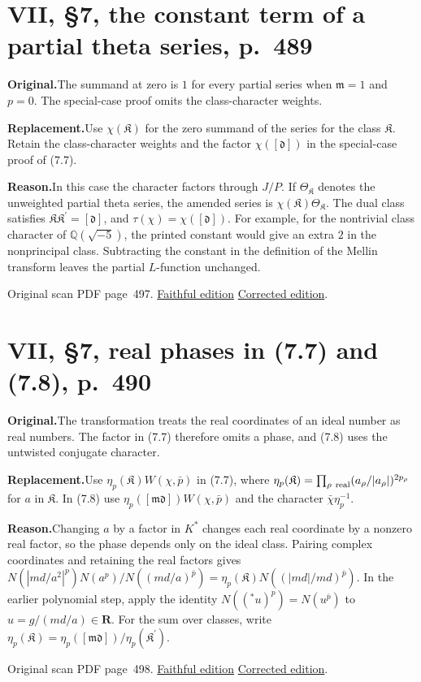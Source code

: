 \documentclass[11pt,a4paper]{article}
\newcommand{\original}{\par\smallskip\noindent\textbf{Original.}\enspace}
\newcommand{\replacement}{\par\smallskip\noindent\textbf{Replacement.}\enspace}
\newcommand{\reason}{\par\smallskip\noindent\textbf{Reason.}\enspace}
\newcommand{\editionlink}[3]{\href{#1\#errata.#2}{#3}}
\newcommand{\location}[2]{%
  \par\smallskip\noindent Original scan PDF page~#2.\enspace
  \editionlink{Neukirch_Faithful.pdf}{#1}{Faithful edition}
  \quad\editionlink{Neukirch_Corrected.pdf}{#1}{Corrected edition}.}
\begin{document}
\setcounter{section}{205}
\section{VII, \S7, the constant term of a partial theta series, p.~489}\label{errata:item:206}

\original The summand at zero is $1$ for every partial series when $\mathfrak m=1$ and $p=0$. The special-case proof omits the class-character weights.
\replacement Use $\chi(\mathfrak K)$ for the zero summand of the series for the class $\mathfrak K$. Retain the class-character weights and the factor $\chi([\mathfrak d])$ in the special-case proof of (7.7).
\reason In this case the character factors through $J/P$. If $\Theta_{\mathfrak K}$ denotes the unweighted partial theta series, the amended series is $\chi(\mathfrak K)\Theta_{\mathfrak K}$. The dual class satisfies $\mathfrak K\mathfrak K^{\prime}=[\mathfrak d]$, and $\tau(\chi)=\chi([\mathfrak d])$. For example, for the nontrivial class character of $\mathbb Q(\sqrt{-5})$, the printed constant would give an extra $2$ in the nonprincipal class. Subtracting the constant in the definition of the Mellin transform leaves the partial $L$-function unchanged.
\location{206}{497}

\setcounter{section}{206}
\section{VII, \S7, real phases in (7.7) and (7.8), p.~490}\label{errata:item:207}

\original The transformation treats the real coordinates of an ideal number as real numbers. The factor in (7.7) therefore omits a phase, and (7.8) uses the untwisted conjugate character.
\replacement Use $\eta_p(\mathfrak K)W(\chi,\bar p)$ in (7.7), where $\eta_p(\mathfrak K)=\prod_{\rho\ {\rm real}}(a_\rho/|a_\rho|)^{2p_\rho}$ for $a$ in $\mathfrak K$. In (7.8) use $\eta_p([\mathfrak m\mathfrak d])W(\chi,\bar p)$ and the character $\bar\chi\eta_p^{-1}$.
\reason Changing $a$ by a factor in $K^*$ changes each real coordinate by a nonzero real factor, so the phase depends only on the ideal class. Pairing complex coordinates and retaining the real factors gives $N(|md/a^2|^p)N(a^p)/N((md/a)^{\bar p})=\eta_p(\mathfrak K)N((|md|/md)^{\bar p})$. In the earlier polynomial step, apply the identity $N(({}^*u)^p)=N(u^{\bar p})$ to $u=g/(md/a)\in\mathbf R$. For the sum over classes, write $\eta_p(\mathfrak K)=\eta_p([\mathfrak m\mathfrak d])/\eta_p(\mathfrak K^{\prime})$.
\location{207}{498}
\end{document}
